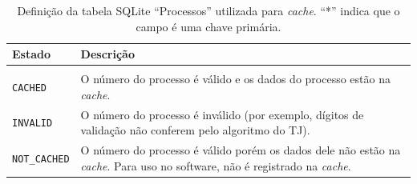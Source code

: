 \begin{table}[htb]
    \centering
    \begin{tabular}{lp{}}
        \toprule
        Estado & Descrição \\
        \midrule \\
        \texttt{CACHED} & O número do processo é válido e os dados do processo estão na \textit{cache}. \\
        \texttt{INVALID} & O número do processo é inválido (por exemplo, dígitos de validação não conferem pelo algoritmo do TJ). \\
        \texttt{NOT\_CACHED} & O número do processo é válido porém os dados dele não estão na \textit{cache}. Para uso no software, não é registrado na \textit{cache}. \\
        \bottomrule
    \end{tabular}
    \caption{%
        Definição da tabela SQLite ``Processos'' utilizada para \textit{cache}.
        ``*'' indica que o campo é uma chave primária.
    }
    \label{tbl:estrutura-tabela-processos}
\end{table}
